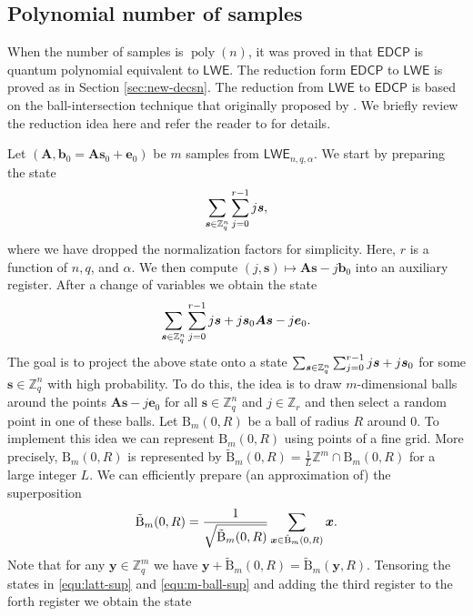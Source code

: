 \documentclass[11pt]{article}
\theoremstyle{plain}
\theoremstyle{definition}
\DeclareMathOperator{\poly}{poly}
\let\ket\relax
\DeclarePairedDelimiter{\ket}{\lvert}{\rangle}
\def\Z{\mathbb{Z}}
\def\lwe{\mathsf{LWE}}
\def\edcp{\mathsf{EDCP}}
\begin{document}
\subsection{Polynomial number of samples}
\label{sec:hardness-poly}

When the number of samples is $\poly(n)$, it was proved in \cite{brakerski2018learning} that $\edcp$ is quantum polynomial equivalent to $\lwe$. The reduction form $\edcp$ to $\lwe$ is proved as in Section \ref{sec:new-decsn}. The reduction from $\lwe$ to $\edcp$ is based on the ball-intersection technique that originally proposed by \cite{regev2004quantum}. We briefly review the reduction idea here and refer the reader to \cite{regev2004quantum, brakerski2018learning} for details.

Let $(\bm{A}, \bm{b}_0 = \bm{As}_0 + \bm{e}_0)$ be $m$ samples from $\lwe_{n, q, \alpha}$. We start by preparing the state 
\[ \sum_{\bm{s} \in \Z_q^n} \sum_{j = 0}^{r - 1} \ket{j}\ket{\bm{s}}, \]
where we have dropped the normalization factors for simplicity. Here, $r$ is a function of $n, q$, and $\alpha$. We then compute $(j, \bm{s}) \mapsto \bm{As} - j\bm{b}_0$ into an auxiliary register. After a change of variables we obtain the state
\begin{equation}
    \label{equ:latt-sup}
    \sum_{\bm{s} \in \Z_q^n} \sum_{j = 0}^{r - 1} \ket{j}\ket{\bm{s} + j\bm{s}_0}\ket{\bm{As} - j\bm{e}_0}.
\end{equation}
The goal is to project the above state onto a state $\sum_{\bm{s} \in \Z_q^n} \sum_{j = 0}^{r - 1} \ket{j}\ket{\bm{s} + j\bm{s}_0}$ for some $\bm{s} \in \Z_q^n$ with high probability. To do this, the idea is to draw $m$-dimensional balls around the points $\bm{As} - j\bm{e}_0$ for all $\bm{s} \in \Z_q^n$ and $j \in \Z_r$ and then select a random point in one of these balls. Let $\mathrm{B}_m(0, R)$ be a ball of radius $R$ around $0$. To implement this idea we can represent $\mathrm{B}_m(0, R)$ using points of a fine grid. More precisely, $\mathrm{B}_m(0, R)$ is represented by $\tilde{\mathrm{B}}_m(0, R) = \frac{1}{L} \Z^m \cap \mathrm{B}_m(0, R)$ for a large integer $L$. We can efficiently prepare (an approximation of) the superposition
\begin{equation}
    \label{equ:m-ball-sup}
    \ket{\tilde{\mathrm{B}}_m(0, R)} = \frac{1}{\sqrt{\tilde{\mathrm{B}}_m(0, R)}} \sum_{\bm{x} \in \tilde{\mathrm{B}}_m(0, R)} \ket{\bm{x}}.
\end{equation}
Note that for any $\bm{y} \in \Z_q^m$ we have $\bm{y} + \tilde{\mathrm{B}}_m(0, R) = \tilde{\mathrm{B}}_m(\bm{y}, R)$. Tensoring the states in \eqref{equ:latt-sup} and \eqref{equ:m-ball-sup} and adding the third register to the forth register we obtain the state
\end{document}
